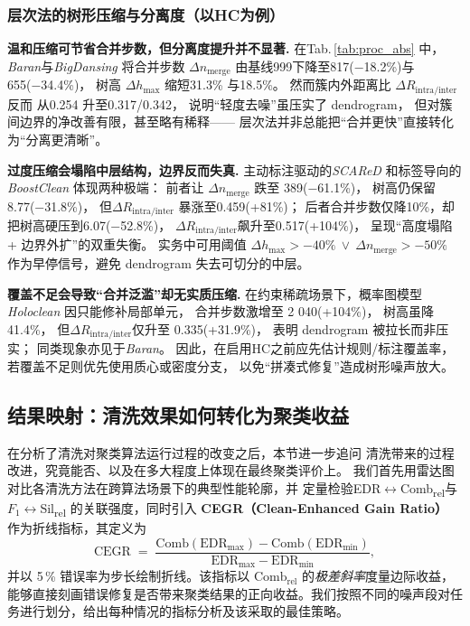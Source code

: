 \documentclass[10pt]{article} %
\numberwithin{equation}{section}
\begin{document}
\subsubsection{层次法的树形压缩与分离度（以HC为例）}
\label{subsec:hierarch_dynamics}

\medskip
\noindent
\textbf{温和压缩可节省合并步数，但分离度提升并不显著.}\;
在Tab.\,\ref{tab:proc_abs} 中，%
\textit{Baran}与\textit{BigDansing} 将合并步数
$\Delta n_{\text{merge}}$ 由基线999下降至817(−18.2\%)与655(−34.4\%)，%
树高 $\Delta h_{\max}$ 缩短31.3\% 与18.5\%。%
然而簇内外距离比 $\Delta R_{\text{intra/inter}}$ 反而
从0.254 升至0.317/0.342，%
说明“轻度去噪”虽压实了 dendrogram，%
但对簇间边界的净改善有限，甚至略有稀释——%
层次法并非总能把“合并更快”直接转化为“分离更清晰”。

\medskip
\noindent
\textbf{过度压缩会塌陷中层结构，边界反而失真.}\;
主动标注驱动的\textit{SCAReD} 和标签导向的\textit{BoostClean}
体现两种极端：%
前者让 $\Delta n_{\text{merge}}$ 跌至 389(−61.1\%)，
树高仍保留8.77(−31.8\%)，%
但$\Delta R_{\text{intra/inter}}$ 暴涨至0.459(+81\%)；%
后者合并步数仅降10\%，却把树高硬压到6.07(−52.8\%)，
$\Delta R_{\text{intra/inter}}$飙升至0.517(+104\%)，%
呈现“高度塌陷 + 边界外扩”的双重失衡。%
实务中可用阈值
\(\Delta h_{\max}>−40\% \ \lor\ \Delta n_{\text{merge} }>-50\%\)
作为早停信号，避免 dendrogram 失去可切分的中层。

\medskip
\noindent
\textbf{覆盖不足会导致“合并泛滥”却无实质压缩.}\;
在约束稀疏场景下，概率图模型\textit{Holoclean}
因只能修补局部单元，%
合并步数激增至 2 040(+104\%)，%
树高虽降41.4\%，%
但$\Delta R_{\text{intra/inter}}$仅升至 0.335(+31.9\%)，%
表明 dendrogram 被拉长而非压实；%
同类现象亦见于\textit{Baran}。%
因此，在启用HC之前应先估计规则/标注覆盖率，%
若覆盖不足则优先使用质心或密度分支，%
以免“拼凑式修复”造成树形噪声放大。


\subsection{结果映射：清洗效果如何转化为聚类收益}
\label{sec:q3-metric}

在分析了清洗对聚类算法运行过程的改变之后，本节进一步追问  
清洗带来的过程改进，究竟能否、以及在多大程度上体现在最终聚类评价上。
我们首先用雷达图对比各清洗方法在跨算法场景下的典型性能轮廓，并  
定量检验EDR$\leftrightarrow$Comb\textsubscript{rel}与\(F_1\)$\leftrightarrow$Sil\textsubscript{rel} 的关联强度，同时引入 \textbf{CEGR（Clean-Enhanced Gain Ratio）} 作为折线指标，其定义为
\begin{equation}
  \mathrm{CEGR}
  \;=\;
  \frac{\text{Comb}(\mathrm{EDR}_{\max})-\text{Comb}(\mathrm{EDR}_{\min})}
       {\mathrm{EDR}_{\max}-\mathrm{EDR}_{\min}},
  \label{eq:cegr-def}
\end{equation}
并以 5\,\% 错误率为步长绘制折线。该指标以 \(\text{Comb}_{\text{rel}}\) 的\emph{极差斜率}度量边际收益，能够直接刻画错误修复是否带来聚类结果的正向收益。我们按照不同的噪声段对任务进行划分，给出每种情况的指标分析及该采取的最佳策略。
\end{document}
